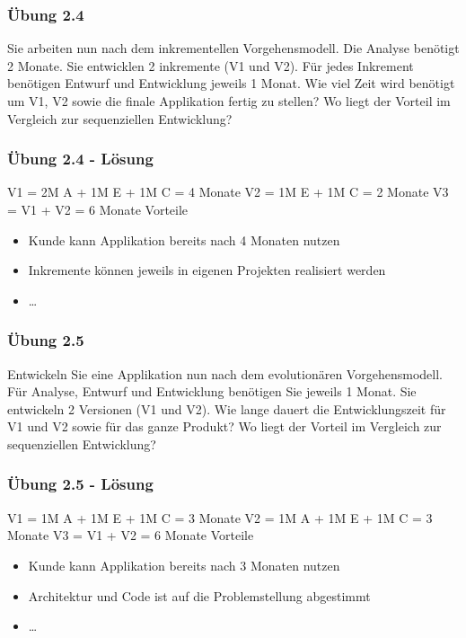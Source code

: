 \begin{frame}
\frametitle{Übung 2.4}
	Sie arbeiten nun nach dem inkrementellen Vorgehensmodell. Die Analyse benötigt 2 Monate. Sie
	entwicklen 2 inkremente (V1 und V2). Für jedes Inkrement benötigen Entwurf und Entwicklung jeweils 
	1 Monat. Wie viel Zeit wird benötigt um V1, V2 sowie die finale Applikation fertig zu stellen?
	Wo liegt der Vorteil im Vergleich zur sequenziellen Entwicklung?
\end{frame}

\ifloesung
\begin{frame}
\frametitle{Übung 2.4 - Lösung}
	V1 = 2M A + 1M E + 1M C = 4 Monate
	\newline
	V2 = 1M E + 1M C = 2 Monate
	\newline
	V3 = V1 + V2 = 6 Monate
	\newline\newline
	Vorteile
	\begin{itemize}
		\item Kunde kann Applikation bereits nach 4 Monaten nutzen
		\item Inkremente können jeweils in eigenen Projekten realisiert werden
		\item \ldots
	\end{itemize}
\end{frame}
\fi

\begin{frame}
\frametitle{Übung 2.5}
	Entwickeln Sie eine Applikation nun nach dem evolutionären Vorgehensmodell. Für Analyse, 
	Entwurf und Entwicklung benötigen Sie jeweils 1 Monat. Sie entwickeln 2 Versionen (V1 und V2).
	Wie lange dauert die Entwicklungszeit für V1 und V2 sowie für das ganze Produkt?
	Wo liegt der Vorteil im Vergleich zur sequenziellen Entwicklung?
\end{frame}

\ifloesung
\begin{frame}[fragile]
\frametitle{Übung 2.5 - Lösung}
	V1 = 1M A + 1M E + 1M C = 3 Monate
	\newline
	V2 = 1M A + 1M E + 1M C = 3 Monate
	\newline
	V3 = V1 + V2 = 6 Monate
	\newline\newline
	Vorteile
	\begin{itemize}
		\item Kunde kann Applikation bereits nach 3 Monaten nutzen
		\item Architektur und Code ist auf die Problemstellung abgestimmt
		\item \ldots
	\end{itemize}
\end{frame}
\fi

